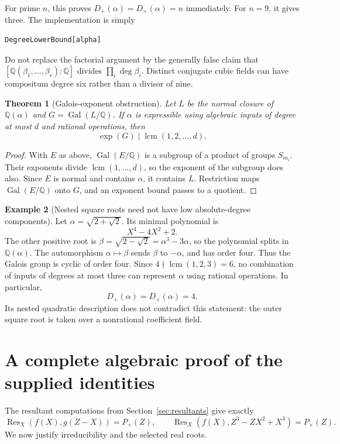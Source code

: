 \documentclass[11pt,a4paper]{article}
\newcommand{\Q}{\mathbb Q}
\newcommand{\Gal}{\operatorname{Gal}}
\newcommand{\Res}{\operatorname{Res}}
\newcommand{\lcm}{\operatorname{lcm}}
\newcommand{\dplus}{D_{+}}
\newcommand{\dtimes}{D_{\times}}
\newtheorem{theorem}{Theorem}[section]
\theoremstyle{definition}
\newtheorem{example}[theorem]{Example}
\theoremstyle{remark}
\begin{document}
For prime $n$, this proves $\dplus(\alpha)=\dtimes(\alpha)=n$ immediately. For $n=9$, it gives three. The implementation is simply
\begin{lstlisting}
DegreeLowerBound[alpha]
\end{lstlisting}
Do not replace the factorial argument by the generally false claim that $[\Q(\beta_1,\ldots,\beta_r):\Q]$ divides $\prod_i\deg\beta_i$. Distinct conjugate cubic fields can have compositum degree six rather than a divisor of nine.

\begin{theorem}[Galois-exponent obstruction]
\label{thm:exponent}
Let $L$ be the normal closure of $\Q(\alpha)$ and $G=\Gal(L/\Q)$. If $\alpha$ is expressible using algebraic inputs of degree at most $d$ and rational operations, then
\[
 \exp(G)\mid\lcm(1,2,\ldots,d).
\]
\end{theorem}
\begin{proof}
With $E$ as above, $\Gal(E/\Q)$ is a subgroup of a product of groups $S_{m_i}$. Their exponents divide $\lcm(1,\ldots,d)$, so the exponent of the subgroup does also. Since $E$ is normal and contains $\alpha$, it contains $L$. Restriction maps $\Gal(E/\Q)$ onto $G$, and an exponent bound passes to a quotient.
\end{proof}

\begin{example}[Nested square roots need not have low absolute-degree components]
Let $\alpha=\sqrt{2+\sqrt2}$. Its minimal polynomial is
\[
 X^4-4X^2+2.
\]
The other positive root is $\beta=\sqrt{2-\sqrt2}=\alpha^3-3\alpha$, so the polynomial splits in $\Q(\alpha)$. The automorphism $\alpha\mapsto\beta$ sends $\beta$ to $-\alpha$, and has order four. Thus the Galois group is cyclic of order four. Since $4\nmid\lcm(1,2,3)=6$, no combination of inputs of degrees at most three can represent $\alpha$ using rational operations. In particular,
\[
 \dplus(\alpha)=\dtimes(\alpha)=4.
\]
Its nested quadratic description does not contradict this statement: the outer square root is taken over a nonrational coefficient field.
\end{example}

\section{A complete algebraic proof of the supplied identities}
\label{sec:exampleproof}
The resultant computations from Section~\ref{sec:resultants} give exactly
\[
 \Res_X(f(X),g(Z-X))=P_+(Z),\qquad
 \Res_X(f(X),Z^3-ZX^2+X^3)=P_{\times}(Z).
\]
We now justify irreducibility and the selected real roots.
\end{document}
